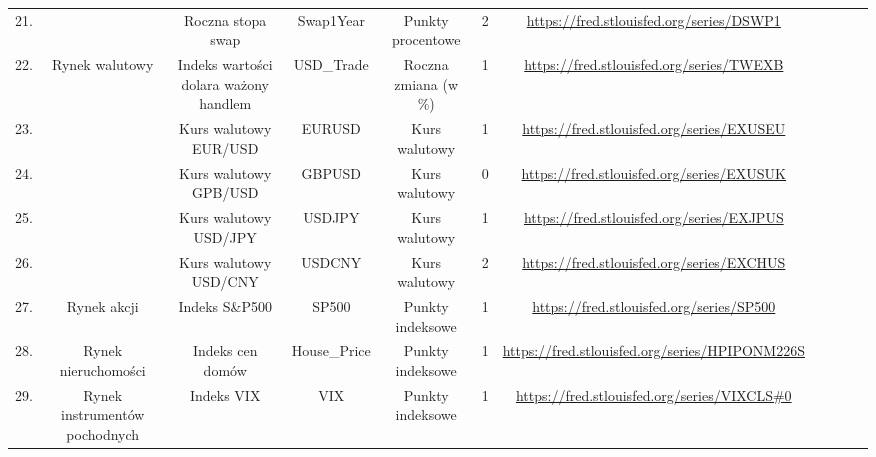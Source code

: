 \begin{landscape}
\begin{table}[h]
\begin{tabular}{|c|c|c|c|c|c|c|llll}
21.           &                                                  & Roczna stopa swap & Swap1Year                        & Punkty procentowe  & 2  & \url{https://fred.stlouisfed.org/series/DSWP1}             &  &  &  &  \\ \cline{1-7}
22.           & \multirow{5}{*}{Rynek walutowy}                  & Indeks wartości dolara ważony handlem & USD\_Trade                       & Roczna zmiana (w \%) & 1 & \url{https://fred.stlouisfed.org/series/TWEXB}             &  &  &  &  \\ \cline{1-1} \cline{3-7}
23.           &                                                  & Kurs walutowy EUR/USD & EURUSD                           & Kurs walutowy  &  1  & \url{https://fred.stlouisfed.org/series/EXUSEU}           &  &  &  &  \\ \cline{1-1} \cline{3-7}
24.           &                                                  & Kurs walutowy GPB/USD  & GBPUSD                           & Kurs walutowy    &  0 & \url{https://fred.stlouisfed.org/series/EXUSUK}           &  &  &  &  \\ \cline{1-1} \cline{3-7}
25.           &                                                  & Kurs walutowy USD/JPY  & USDJPY                           & Kurs walutowy   & 1 & \url{https://fred.stlouisfed.org/series/EXJPUS}            &  &  &  &  \\ \cline{1-1} \cline{3-7}
26.           &                                                  & Kurs walutowy USD/CNY & USDCNY                           & Kurs walutowy   & 2  & \url{https://fred.stlouisfed.org/series/EXCHUS}            &  &  &  &  \\ \cline{1-7}
27.           & Rynek akcji                                      & Indeks S\&P500                                                                                    & SP500                            & Punkty indeksowe     & 1 & \url{https://fred.stlouisfed.org/series/SP500}           &  &  &  &  \\ \cline{1-7}
28.           & Rynek nieruchomości                              & Indeks cen domów & House\_Price                     & Punkty indeksowe   & 1 & \url{https://fred.stlouisfed.org/series/HPIPONM226S}       &  &  &  &  \\ \cline{1-7}
29.           & Rynek instrumentów pochodnych                    & Indeks VIX & VIX                              & Punkty indeksowe     & 1 & \url{https://fred.stlouisfed.org/series/VIXCLS\#0}        &  &  &  &  \\ \cline{1-7}

\end{tabular}
\end{table}
\end{landscape}
